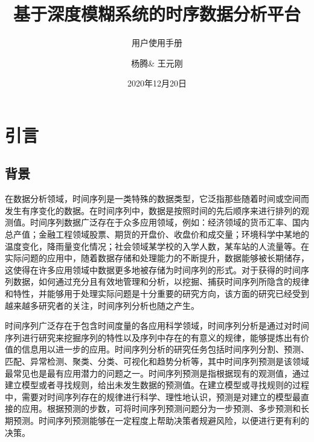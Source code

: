 \documentclass[cn,11pt,chinese]{elegantbook}
\title{基于深度模糊系统的时序数据分析平台}
\subtitle{用户使用手册}
\author{杨腾\& 王元刚}
\date{2020年12月20日}
\begin{document}
\maketitle
\frontmatter

%
%
%
%

\tableofcontents

\mainmatter
\chapter{引言}
\section{背景}
在数据分析领域，时间序列是一类特殊的数据类型，它泛指那些随着时间或空间而发生有序变化的数据。在时间序列中，数据是按照时间的先后顺序来进行排列的观测值。时间序列数据广泛存在于众多应用领域，例如：经济领域的货币汇率、国内总产值；金融工程领域股票、期货的开盘价、收盘价和成交量；环境科学中某地的温度变化，降雨量变化情况；社会领域某学校的入学人数，某车站的人流量等。在实际问题的应用中，随着数据存储和处理能力的不断提升，数据能够被长期储存，这使得在许多应用领域中数据更多地被存储为时间序列的形式。对于获得的时间序列数据，如何通过充分且有效地管理和分析，以挖掘、捕获时间序列所隐含的规律和特性，并能够用于处理实际问题是十分重要的研究方向，该方面的研究已经受到越来越多研究者的关注，时间序列分析也随之产生。

时间序列广泛存在于包含时间度量的各应用科学领域，时间序列分析是通过对时间序列进行研究来挖掘序列的特性以及序列中存在的有意义的规律，能够提炼出有价值的信息用以进一步的应用。时间序列分析的研究任务包括时间序列分割、预测、匹配、异常检测、聚类、分类、可视化和趋势分析等，其中时间序列预测是该领域最常见也是最有应用潜力的问题之一。时间序列预测是指根据现有的观测值，通过建立模型或者寻找规则，给出未发生数据的预测值。在建立模型或寻找规则的过程中，需要对时间序列存在的规律进行科学、理性地认识，预测是对建立的模型最直接的应用。根据预测的步数，可将时间序列预测问题分为一步预测、多步预测和长期预测。时间序列预测能够在一定程度上帮助决策者规避风险，以便进行更有利的决策。
\end{document}
